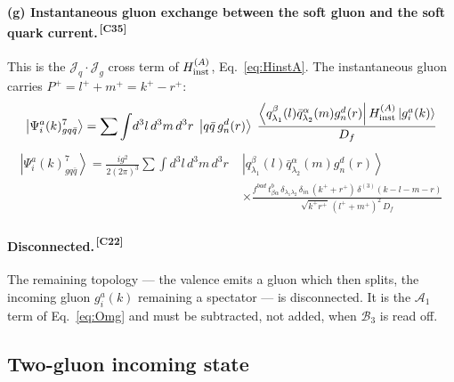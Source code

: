 \documentclass[11pt]{article}
\newcommand{\ibar}[2]{\draw[line width=1.1pt] (#1-0.13,#2) -- (#1+0.13,#2);}
\newcommand{\dthree}{\delta^{(3)}}
\newcommand{\ket}[1]{\left|#1\right\rangle}
\newcommand{\bra}[1]{\left\langle#1\right|}
\newcommand{\Jc}{\mathcal{J}}
\newcommand{\qk}[3]{q^{#1}_{#2}(#3)}
\newcommand{\aqk}[3]{\bar q^{#1}_{#2}(#3)}
\newcommand{\gl}[3]{g^{#1}_{#2}(#3)}
\newcommand{\A}{\mathcal{A}}
\newcommand{\B}{\mathcal{B}}
\newcommand{\chg}[1]{{\color{blue!70!black}\textsuperscript{\,[C#1]}}}
\begin{document}
\paragraph{(g) Instantaneous gluon exchange between the soft gluon and the soft quark
current.\chg{35}}
\begin{center}
\end{center}
This is the $\Jc_{q}\!\cdot\!\Jc_{g}$ cross term of $H^{(A)}_{\rm inst}$, Eq.~\eqref{eq:HinstA}.
The instantaneous gluon carries $P^{+}=l^{+}+m^{+}=k^{+}-r^{+}$:
\begin{equation}
\ket{\Psi^{a}_{i}(k)^{7}_{gq\bar q}}=\sum\int\!d^{3}l\,d^{3}m\,d^{3}r\;
\ket{q\bar q\,\gl{d}{n}{r}}\;
\frac{\bra{\qk{\beta}{\lambda_{1}}{l}\aqk{\alpha}{\lambda_{2}}{m}\gl{d}{n}{r}}
H^{(A)}_{\rm inst}\ket{\gl{a}{i}{k}}}{D_{f}}
\end{equation}
\begin{align}
\ket{\Psi^{a}_{i}(k)^{7}_{gq\bar q}}=\frac{i g^{2}}{2(2\pi)^{3}}\sum\int\!d^{3}l\,d^{3}m\,d^{3}r\;
&\ket{\qk{\beta}{\lambda_{1}}{l}\aqk{\alpha}{\lambda_{2}}{m}\gl{d}{n}{r}}
\nonumber\\&\times
\frac{f^{bad}\,t^{b}_{\beta\alpha}\,\delta_{\lambda_{1}\lambda_{2}}\,\delta_{in}\,(k^{+}+r^{+})\,
\dthree(k-l-m-r)}{\sqrt{k^{+}r^{+}}\,(l^{+}+m^{+})^{2}\,D_{f}}
\label{eq:B2g}
\end{align}

\paragraph{Disconnected.\chg{22}} The remaining topology --- the valence emits a gluon which then
splits, the incoming gluon $\gl{a}{i}{k}$ remaining a spectator --- is disconnected. It is the
$\A_{1}$ term of Eq.~\eqref{eq:Omg} and must be subtracted, not added, when $\B_{3}$ is read off.

\subsection{Two-gluon incoming state}
\end{document}
